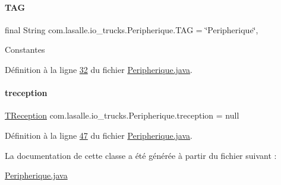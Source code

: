 \paragraph{\texorpdfstring{T\+AG}{TAG}}
{\footnotesize\ttfamily final String com.\+lasalle.\+io\+\_\+trucks.\+Peripherique.\+T\+AG = \char`\"{}Peripherique\char`\"{}\hspace{0.3cm}{\ttfamily [static]}, {\ttfamily [private]}}

Constantes 

Définition à la ligne \hyperlink{_peripherique_8java_source_l00032}{32} du fichier \hyperlink{_peripherique_8java_source}{Peripherique.\+java}.

\mbox{\label{classcom_1_1lasalle_1_1io__trucks_1_1_peripherique_ac1dde247bc593447515e3d7b3ad73550}} 
\paragraph{\texorpdfstring{treception}{treception}}
{\footnotesize\ttfamily \hyperlink{classcom_1_1lasalle_1_1io__trucks_1_1_peripherique_1_1_t_reception}{T\+Reception} com.\+lasalle.\+io\+\_\+trucks.\+Peripherique.\+treception = null\hspace{0.3cm}{\ttfamily [private]}}



Définition à la ligne \hyperlink{_peripherique_8java_source_l00047}{47} du fichier \hyperlink{_peripherique_8java_source}{Peripherique.\+java}.



La documentation de cette classe a été générée à partir du fichier suivant \+:\begin{DoxyCompactItemize}
\item 
\hyperlink{_peripherique_8java}{Peripherique.\+java}\end{DoxyCompactItemize}
